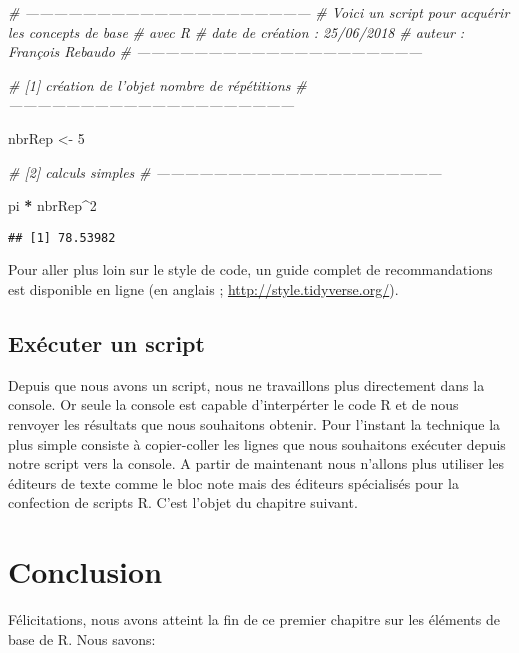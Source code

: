 \documentclass[]{book}
\newenvironment{Shaded}{\begin{snugshade}}{\end{snugshade}}
\newcommand{\DecValTok}[1]{\textcolor[rgb]{0.00,0.00,0.81}{#1}}
\newcommand{\StringTok}[1]{\textcolor[rgb]{0.31,0.60,0.02}{#1}}
\newcommand{\CommentTok}[1]{\textcolor[rgb]{0.56,0.35,0.01}{\textit{#1}}}
\newcommand{\OperatorTok}[1]{\textcolor[rgb]{0.81,0.36,0.00}{\textbf{#1}}}
\newcommand{\NormalTok}[1]{#1}
\theoremstyle{definition}
\theoremstyle{definition}
\theoremstyle{definition}
\theoremstyle{remark}
\begin{document}
\begin{Shaded}
\begin{Highlighting}[]
\CommentTok{# ------------------------------------------------------------}
\CommentTok{# Voici un script pour acquérir les concepts de base }
\CommentTok{# avec R}
\CommentTok{# date de création : 25/06/2018}
\CommentTok{# auteur : François Rebaudo}
\CommentTok{# ------------------------------------------------------------}

\CommentTok{# [1] création de l'objet nombre de répétitions}
\CommentTok{# ------------------------------------------------------------}

\NormalTok{nbrRep <-}\StringTok{ }\DecValTok{5}

\CommentTok{# [2] calculs simples}
\CommentTok{# ------------------------------------------------------------}

\NormalTok{pi }\OperatorTok{*}\StringTok{ }\NormalTok{nbrRep}\OperatorTok{^}\DecValTok{2}
\end{Highlighting}
\end{Shaded}

\begin{verbatim}
## [1] 78.53982
\end{verbatim}

Pour aller plus loin sur le style de code, un guide complet de
recommandations est disponible en ligne (en anglais ;
\url{http://style.tidyverse.org/}).

\subsection{Exécuter un script}\label{executer-un-script}

Depuis que nous avons un script, nous ne travaillons plus directement
dans la console. Or seule la console est capable d'interpérter le code R
et de nous renvoyer les résultats que nous souhaitons obtenir. Pour
l'instant la technique la plus simple consiste à copier-coller les
lignes que nous souhaitons exécuter depuis notre script vers la console.
A partir de maintenant nous n'allons plus utiliser les éditeurs de texte
comme le bloc note mais des éditeurs spécialisés pour la confection de
scripts R. C'est l'objet du chapitre suivant.

\section{Conclusion}\label{conclusion}

Félicitations, nous avons atteint la fin de ce premier chapitre sur les
éléments de base de R. Nous savons:
\end{document}
